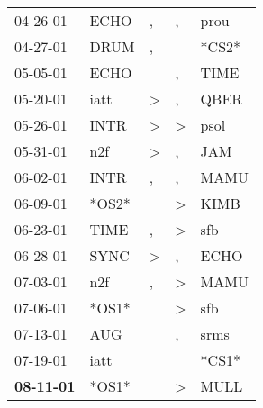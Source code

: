 \begin{supertabular}{p{0.07\textwidth}p{0.06\textwidth}p{0.02\textwidth}p{0.02\textwidth}p{0.06\textwidth}}
          04-26-01\textsuperscript{} &           ECHO\textsuperscript{} &                , &             , &           prou\textsuperscript{} \\
          04-27-01\textsuperscript{} &           DRUM\textsuperscript{} &                , &               &                            *CS2* \\
          05-05-01\textsuperscript{} &           ECHO\textsuperscript{} &                  &             , &           TIME\textsuperscript{} \\
          05-20-01\textsuperscript{} &           iatt\textsuperscript{} &     \textgreater &             , &           QBER\textsuperscript{} \\
          05-26-01\textsuperscript{} &           INTR\textsuperscript{} &     \textgreater &  \textgreater &           psol\textsuperscript{} \\
          05-31-01\textsuperscript{} &            n2f\textsuperscript{} &     \textgreater &             , &            JAM\textsuperscript{} \\
          06-02-01\textsuperscript{} &           INTR\textsuperscript{} &                , &             , &           MAMU\textsuperscript{} \\
          06-09-01\textsuperscript{} &                            *OS2* &                  &  \textgreater &           KIMB\textsuperscript{} \\
          06-23-01\textsuperscript{} &           TIME\textsuperscript{} &                , &  \textgreater &            sfb\textsuperscript{} \\
          06-28-01\textsuperscript{} &           SYNC\textsuperscript{} &     \textgreater &             , &           ECHO\textsuperscript{} \\
          07-03-01\textsuperscript{} &            n2f\textsuperscript{} &                , &  \textgreater &           MAMU\textsuperscript{} \\
          07-06-01\textsuperscript{} &                            *OS1* &                  &  \textgreater &            sfb\textsuperscript{} \\
          07-13-01\textsuperscript{} &            AUG\textsuperscript{} &                  &             , &           srms\textsuperscript{} \\
          07-19-01\textsuperscript{} &           iatt\textsuperscript{} &                  &               &                            *CS1* \\
 \textbf{08-11-01\textsuperscript{}} &                            *OS1* &                  &  \textgreater &           MULL\textsuperscript{} \\

\end{supertabular}
